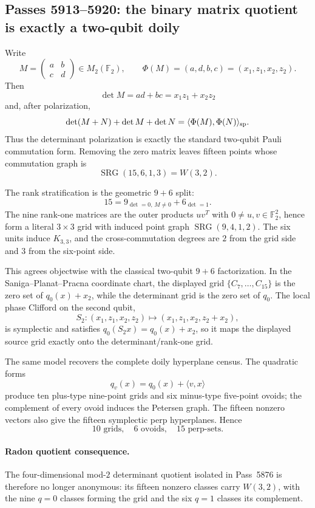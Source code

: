 \subsection*{Passes 5913--5920: the binary matrix quotient is exactly a two-qubit doily}

Write
\[
M=\begin{pmatrix}a&b\\c&d\end{pmatrix}\in M_2(\mathbb F_2),
\qquad
\Phi(M)=(a,d,b,c)=(x_1,z_1,x_2,z_2).
\]
Then
\[
\det M=ad+bc=x_1z_1+x_2z_2
\]
and, after polarization,
\[
\det(M+N)+\det M+\det N
=
\langle\Phi(M),\Phi(N)\rangle_{\rm sp}.
\]
Thus the determinant polarization is exactly the standard two-qubit Pauli
commutation form.  Removing the zero matrix leaves fifteen points whose
commutation graph is
\[
\boxed{\operatorname{SRG}(15,6,1,3)=W(3,2).}
\]

The rank stratification is the geometric $9+6$ split:
\[
\boxed{
15=9_{\det=0,\,M\ne0}+6_{\det=1}.
}
\]
The nine rank-one matrices are the outer products $uv^T$ with
$0\ne u,v\in\mathbb F_2^2$, hence form a literal $3\times3$ grid with induced
point graph $\operatorname{SRG}(9,4,1,2)$.  The six units induce $K_{3,3}$,
and the cross-commutation degrees are $2$ from the grid side and $3$ from the
six-point side.

This agrees objectwise with the classical two-qubit $9+6$ factorization.  In
the Saniga--Planat--Pracna coordinate chart, the displayed grid
$\{C_7,\ldots,C_{15}\}$ is the zero set of
$q_0(x)+x_2$, while the determinant grid is the zero set of $q_0$.  The local
phase Clifford on the second qubit,
\[
S_2:(x_1,z_1,x_2,z_2)\mapsto(x_1,z_1,x_2,z_2+x_2),
\]
is symplectic and satisfies $q_0(S_2x)=q_0(x)+x_2$, so it maps the displayed
source grid exactly onto the determinant/rank-one grid.

The same model recovers the complete doily hyperplane census.  The quadratic
forms
\[
q_v(x)=q_0(x)+\langle v,x\rangle
\]
produce ten plus-type nine-point grids and six minus-type five-point ovoids;
the complement of every ovoid induces the Petersen graph.  The fifteen
nonzero vectors also give the fifteen symplectic perp hyperplanes.  Hence
\[
\boxed{10\text{ grids},\quad6\text{ ovoids},\quad15\text{ perp-sets}.}
\]

\paragraph{Radon quotient consequence.}
The four-dimensional mod-$2$ determinant quotient isolated in Pass~5876 is
therefore no longer anonymous: its fifteen nonzero classes carry $W(3,2)$,
with the nine $q=0$ classes forming the grid and the six $q=1$ classes its
complement.


